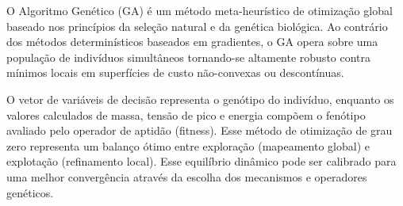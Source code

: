 \documentclass[a4paper, 12pt]{article}%
\begin{document}
O Algoritmo Genético (GA) é um método meta-heurístico de otimização global baseado nos princípios da seleção natural e da genética biológica. Ao contrário dos métodos determinísticos baseados em gradientes, o GA opera sobre uma população de indivíduos simultâneos tornando-se altamente robusto contra mínimos locais em superfícies de custo não-convexas ou descontínuas.

O vetor de variáveis de decisão representa o genótipo do indivíduo, enquanto os valores calculados de massa, tensão de pico e energia compõem o fenótipo avaliado pelo operador de aptidão (fitness). Esse método de otimização de grau zero representa um balanço ótimo entre exploração (mapeamento global) e explotação (refinamento local). Esse equilíbrio dinâmico pode ser calibrado para uma melhor convergência através da escolha dos mecanismos e operadores genéticos.
\end{document}
